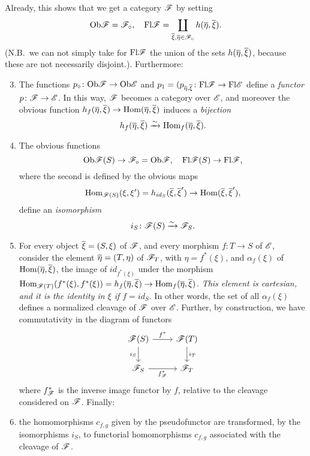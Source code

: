 \documentclass[../main.tex]{subfiles}
\begin{document}
Already, this shows that we get a category $\mathscr{F}$ by setting
\[\mathrm{Ob} \mathscr{F} = \mathscr{F}_\circ, \quad \mathrm{Fl} \mathscr{F} = \coprod_{\overline \xi, \overline \eta \in \mathscr{F}_\circ} h(\overline \eta, \overline \xi).\]
(N.B.\ we can not simply take for $\mathrm{Fl} \mathscr{F}$ the union of the sets $h (\overline \eta, \overline \xi)$, because these are not necessarily disjoint.).
Furthermore:
\begin{enumerate}
    \setcounter{enumi}{2}
    \item The functions $p_\circ \colon \mathrm{Ob} \mathscr{F} \to \mathrm{Ob} \mathscr{E}$ and $p_1 = (p_{\overline \eta, \overline \xi} \colon \mathrm{Fl}\mathscr{F} \to \mathrm{Fl} \mathscr{E}$ define a \emph{functor} $p \colon \mathscr{F} \to \mathscr{E}$. In this way, $\mathscr{F}$ becomes a category over $\mathscr{E}$, and moreover the obvious function $h_f (\overline \eta, \overline \xi) \to \mathrm{Hom} (\overline \eta, \overline \xi)$ induces a \emph{bijection}
    \[h_f(\overline \eta, \overline \xi) \xrightarrow{\sim} \mathrm{Hom}_f(\overline \eta, \overline \xi).\]
    \item The obvious functions
    \[\mathrm{Ob} \mathscr{F}(S) \to \mathscr{F}_\circ = \mathrm{Ob} \mathscr{F}, \quad \mathrm{Fl} \mathscr{F}(S) \to \mathrm{Fl}\mathscr{F},\]
    where the second is defined by the obvious maps
    \[\mathrm{Hom}_{\mathscr{F}(S)} (\xi, \xi') = h_{id_S}(\overline \xi,\overline \xi') \to \mathrm{Hom}(\overline \xi, \overline \xi'),\]
    define an \emph{isomorphism}
    \[i_S \colon \mathscr{F}(S) \xrightarrow{\sim} \mathscr{F}_S.\]
    \item {}For every object $\overline \xi = (S, \xi)$ of $\mathscr{F}$, and every morphism $f \colon T \to S$ of $\mathscr{E}$, consider the element $\overline \eta = (T, \eta)$ of $\mathscr{F}_T$, 
    with $\eta = f^\ast (\xi)$, and $\alpha_f (\xi)$ of $\mathrm{Hom} (\overline \eta, \overline \xi)$, the image of $id_{f^\ast (\xi)}$ under the morphism $\mathrm{Hom}_{\mathscr{F} (T)} (f^\ast(\xi), f ^\ast(\xi)) = h_f (\overline \eta, \overline \xi) \to \mathrm{Hom}_f (\overline \eta, \overline \xi)$.
    \emph{This element is cartesian, and it is the identity in $\xi$ if $f = id_S$}.
    In other words, the set of all $\alpha_f (\xi)$ defines a normalized cleavage of $\mathscr{F}$ over $\mathscr{E}$. 
    Further, by construction, we have commutativity in the diagram of functors
    \[
    \begin{tikzcd}
        \F(S)
        \arrow[r, "f^\ast"]
        \arrow[d, "i_S", swap]
        &
        \F(T)
        \arrow[d, "i_T"]
        \\
        \F_S
        \arrow[r, "f^\ast_\F", swap]
        &
        \F_T
    \end{tikzcd}\]
    where $f^\ast_{\mathscr{F}}$ is the inverse image functor by $f$, relative to the cleavage considered on $\mathscr{F}$. Finally:
    \item the homomorphisms $c_{f, g}$ given by the pseudofunctor are transformed, by the isomorphisms $i_S$, to functorial homomorphisms $c_{f, g}$ associated with the cleavage of $\mathscr{F}$.
\end{enumerate}
\end{document}
